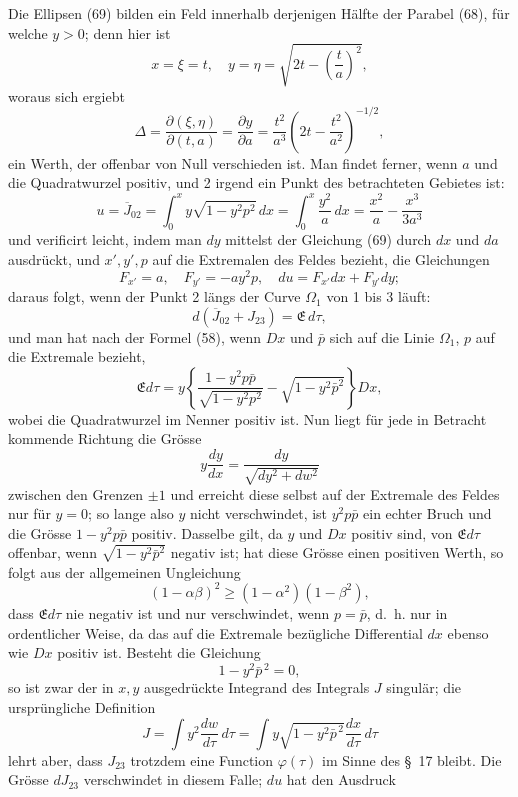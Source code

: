 \documentclass[11pt,a4paper,leqno]{article}
\begin{document}
Die Ellipsen (69) bilden ein Feld innerhalb derjenigen Hälfte der Parabel (68), für welche $y>0$; denn hier ist
\[
x=\xi=t,\quad
y=\eta=\sqrt{2t-\left(\frac{t}{a}\right)^2},
\]
woraus sich ergiebt
\[
\Delta=\frac{\partial(\xi,\eta)}{\partial(t,a)}
=\frac{\partial y}{\partial a}
=
\frac{t^2}{a^3}\left(2t-\frac{t^2}{a^2}\right)^{-1/2},
\]
ein Werth, der offenbar von Null verschieden ist. Man findet ferner, wenn $a$ und die Quadratwurzel positiv, und 2 irgend ein Punkt des betrachteten Gebietes ist:
\begin{equation}\tag{71}
u=\overline{J}_{02}
=
\int_0^x y\sqrt{1-y^2p^2}\,dx
=
\int_0^x\frac{y^2}{a}\,dx
=
\frac{x^2}{a}-\frac{x^3}{3a^3}
\end{equation}
und verificirt leicht, indem man $dy$ mittelst der Gleichung (69) durch $dx$ und $da$ ausdrückt, und $x',y',p$ auf die Extremalen des Feldes bezieht, die Gleichungen
\[
F_{x'}=a,\quad F_{y'}=-ay^2p,\quad du=F_{x'}dx+F_{y'}dy;
\]
daraus folgt, wenn der Punkt 2 längs der Curve $\Omega_1$ von 1 bis 3 läuft:
\[
d(\overline{J}_{02}+J_{23})=\mathfrak{E}\,d\tau,
\]
und man hat nach der Formel (58), wenn $D x$ und $\bar{p}$ sich auf die Linie $\Omega_1$, $p$ auf die Extremale bezieht,
\[
\mathfrak{E}d\tau
=
y\left\{
\frac{1-y^2p\bar{p}}{\sqrt{1-y^2p^2}}
-
\sqrt{1-y^2\bar{p}^2}
\right\}D x,
\]
wobei die Quadratwurzel im Nenner positiv ist. Nun liegt für jede in Betracht kommende Richtung die Grösse
\[
y\frac{dy}{dx}
=
\frac{dy}{\sqrt{dy^2+dw^2}}
\]
zwischen den Grenzen $\pm1$ und erreicht diese selbst auf der Extremale des Feldes nur für $y=0$; so lange also $y$ nicht verschwindet, ist $y^2p\bar{p}$ ein echter Bruch und die Grösse $1-y^2p\bar{p}$ positiv. Dasselbe gilt, da $y$ und $D x$ positiv sind, von $\mathfrak{E}d\tau$ offenbar, wenn $\sqrt{1-y^2\bar{p}^2}$ negativ ist; hat diese Grösse einen positiven Werth, so folgt aus der allgemeinen Ungleichung
\[
(1-\alpha\beta)^2\geq(1-\alpha^2)(1-\beta^2),
\]
dass $\mathfrak{E}d\tau$ nie negativ ist und nur verschwindet, wenn $p=\bar{p}$, d.~h. nur in ordentlicher Weise, da das auf die Extremale bezügliche Differential $dx$ ebenso wie $D x$ positiv ist. Besteht die Gleichung
\[
1-y^2\bar{p}^{\,2}=0,
\]
so ist zwar der in $x,y$ ausgedrückte Integrand des Integrals $J$ singulär; die ursprüngliche Definition
\[
J=\int y^2\frac{dw}{d\tau}\,d\tau
=
\int y\sqrt{1-y^2\bar{p}^{\,2}}\frac{dx}{d\tau}\,d\tau
\]
lehrt aber, dass $J_{23}$ trotzdem eine Function $\varphi(\tau)$ im Sinne des \S~17 bleibt. Die Grösse $dJ_{23}$ verschwindet in diesem Falle; $du$ hat den Ausdruck
\end{document}
